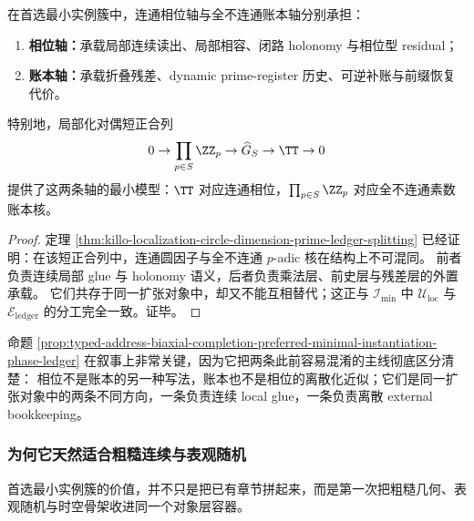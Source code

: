 \begin{proposition}\label{prop:typed-address-biaxial-completion-preferred-minimal-instantiation-phase-ledger}
在首选最小实例簇中，连通相位轴与全不连通账本轴分别承担：
\begin{enumerate}
  \item \textbf{相位轴：}承载局部连续读出、局部相容、闭路 holonomy 与相位型 residual；
  \item \textbf{账本轴：}承载折叠残差、dynamic prime-register 历史、可逆补账与前缀恢复代价。
\end{enumerate}
特别地，局部化对偶短正合列
\[
0\to \prod_{p\in S}\ZZ_p\to \widehat G_S\to \TT\to 0
\]
提供了这两条轴的最小模型：\(\TT\) 对应连通相位，\(\prod_{p\in S}\ZZ_p\) 对应全不连通素数账本核。
\end{proposition}

\begin{proof}
定理 \ref{thm:killo-localization-circle-dimension-prime-ledger-splitting} 已经证明：在该短正合列中，连通圆因子与全不连通 \(p\)-adic 核在结构上不可混同。
前者负责连续局部 glue 与 holonomy 语义，后者负责乘法层、前史层与残差层的外置承载。
它们共存于同一扩张对象中，却又不能互相替代；这正与 \(\mathcal I_{\min}\) 中 \(\mathcal U_{\mathrm{loc}}\) 与 \(\mathcal E_{\mathrm{ledger}}\) 的分工完全一致。证毕。
\end{proof}

命题 \ref{prop:typed-address-biaxial-completion-preferred-minimal-instantiation-phase-ledger} 在叙事上非常关键，因为它把两条此前容易混淆的主线彻底区分清楚：
相位不是账本的另一种写法，账本也不是相位的离散化近似；它们是同一扩张对象中的两条不同方向，一条负责连续 local glue，一条负责离散 external bookkeeping。

\subsubsection{为何它天然适合粗糙连续与表观随机}\label{subsubsec:typed-address-biaxial-completion-preferred-minimal-instantiation-roughness-randomness}
首选最小实例簇的价值，并不只是把已有章节拼起来，而是第一次把粗糙几何、表观随机与时空骨架收进同一个对象层容器。

